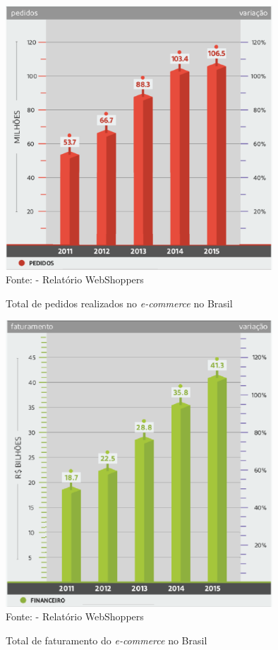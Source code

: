 \documentclass[a4paper,12pt]{monografia}
\begin{document}
\begin{figure}[H]
\centering
\caption{Total de pedidos realizados no \textit{e-commerce} no Brasil}
\centering
\includegraphics[width=10cm]{img/webshoppers/total-pedidos.eps}\\
\small{Fonte:  - Relatório WebShoppers}
\label{figura:pedidos}
\end{figure}

\begin{figure}[H]
\centering
\caption{Total de faturamento do \textit{e-commerce} no Brasil}
\centering
\includegraphics[width=10cm]{img/webshoppers/faturamento.eps}\\
\small{Fonte:  - Relatório WebShoppers}
\label{figura:vendas}
\end{figure}
\end{document}

